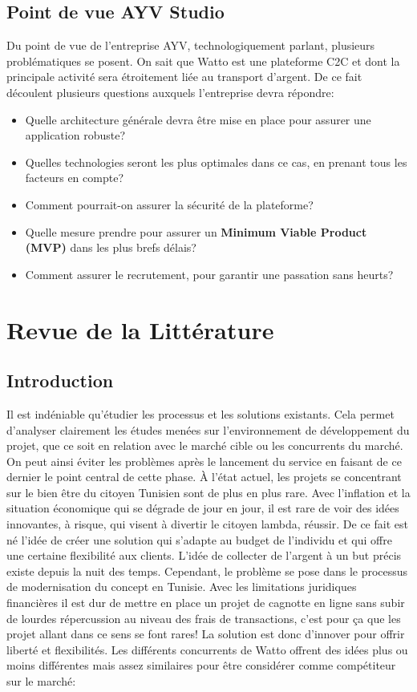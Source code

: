 \documentclass[../main.tex]{subfiles}
\begin{document}
 \subsection{Point de vue AYV Studio}
 Du point de vue de l'entreprise AYV, technologiquement parlant, plusieurs problématiques se posent. On sait que Watto est une plateforme C2C et dont la principale activité sera étroitement liée au transport d'argent. 
 De ce fait découlent plusieurs questions auxquels l'entreprise devra répondre: 
 \begin{itemize}
  \item Quelle architecture générale devra être mise en place pour assurer une application robuste? 
  \item Quelles technologies seront les plus optimales dans ce cas, en prenant tous les facteurs en compte? 
  \item Comment pourrait-on assurer la sécurité de la plateforme? 
  \item Quelle mesure prendre pour assurer un \textbf{Minimum Viable Product (MVP)} dans les plus brefs délais? 
  \item Comment assurer le recrutement, pour garantir une passation sans heurts? 
\end{itemize} 

\newpage 

\section{Revue de la Littérature}
\subsection{Introduction}
Il est indéniable qu'étudier les processus et les solutions existants. Cela permet d'analyser clairement les études menées sur l'environnement de développement du projet, que ce soit en relation avec le marché cible ou les concurrents du marché. 
\newline On peut ainsi éviter les problèmes après le lancement du service en faisant de ce dernier le point central de cette phase. À l'état actuel, les projets se concentrant sur le bien être du citoyen Tunisien sont de plus en plus rare. Avec l'inflation et la situation économique qui se dégrade de jour en jour, il est rare de voir des idées innovantes, à risque, qui visent à divertir le citoyen lambda, réussir. De ce fait est né l'idée de créer une solution qui s'adapte au budget de l'individu et qui offre une certaine flexibilité aux clients. 
\newline L'idée de collecter de l'argent à un but précis existe depuis la nuit des temps. Cependant, le problème se pose dans le processus de modernisation du concept en Tunisie. Avec les limitations juridiques financières il est dur de mettre en place un projet de cagnotte en ligne sans subir de lourdes répercussion au niveau des frais de transactions, c'est pour ça que les projet allant dans ce sens se font rares!
\newline La solution est donc d'innover pour offrir liberté et flexibilités. Les différents concurrents de Watto offrent des idées plus ou moins différentes mais assez similaires pour être considérer comme compétiteur sur le marché: 
\end{document}
